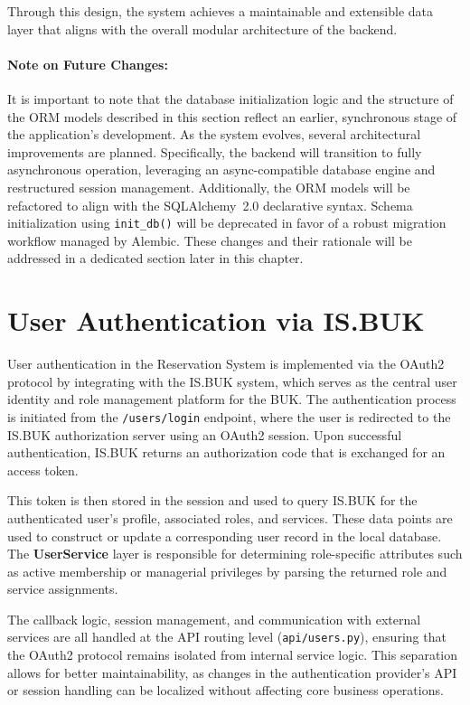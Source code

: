 Through this design, the system achieves a maintainable and extensible data layer that aligns with the overall modular architecture of the backend.

\paragraph{Note on Future Changes:}
It is important to note that the database initialization logic and the structure of the ORM models described in this section reflect an earlier, synchronous stage of the application's development. As the system evolves, several architectural improvements are planned. Specifically, the backend will transition to fully asynchronous operation, leveraging an async-compatible database engine and restructured session management. Additionally, the ORM models will be refactored to align with the SQLAlchemy~2.0 declarative syntax. Schema initialization using \texttt{init\_db()} will be deprecated in favor of a robust migration workflow managed by Alembic. These changes and their rationale will be addressed in a dedicated section later in this chapter.

\section{User Authentication via IS.BUK}

User authentication in the Reservation System is implemented via the OAuth2 protocol by integrating with the IS.BUK system, which serves as the central user identity and role management platform for the BUK. The authentication process is initiated from the \texttt{/users/login} endpoint, where the user is redirected to the IS.BUK authorization server using an OAuth2 session. Upon successful authentication, IS.BUK returns an authorization code that is exchanged for an access token.

This token is then stored in the session and used to query IS.BUK for the authenticated user’s profile, associated roles, and services. These data points are used to construct or update a corresponding user record in the local database. The \textbf{UserService} layer is responsible for determining role-specific attributes such as active membership or managerial privileges by parsing the returned role and service assignments.

The callback logic, session management, and communication with external services are all handled at the API routing level (\texttt{api/users.py}), ensuring that the OAuth2 protocol remains isolated from internal service logic. This separation allows for better maintainability, as changes in the authentication provider’s API or session handling can be localized without affecting core business operations.

